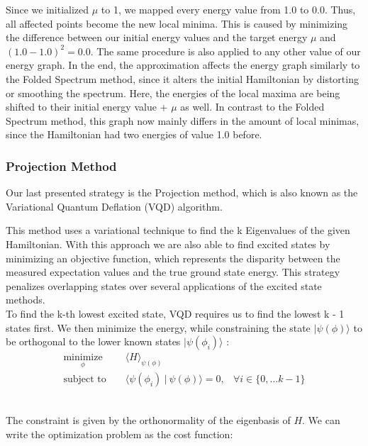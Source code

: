\documentclass[
  letterpaper,
  DIV=11,
  numbers=noendperiod]{scrartcl}
\begin{document}
Since we initialized \(\mu\) to 1, we mapped every energy value from 1.0
to 0.0. Thus, all affected points become the new local minima. This is
caused by minimizing the difference between our initial energy values
and the target energy \(\mu\) and \((1.0 - 1.0)^2 = 0.0\). The same
procedure is also applied to any other value of our energy graph. In the
end, the approximation affects the energy graph similarly to the Folded
Spectrum method, since it alters the initial Hamiltonian by distorting
or smoothing the spectrum. Here, the energies of the local maxima are
being shifted to their initial energy value + \(\mu\) as well. In
contrast to the Folded Spectrum method, this graph now mainly differs in
the amount of local minimas, since the Hamiltonian had two energies of
value 1.0 before.

\subsubsection{Projection Method}\label{projection-method}

Our last presented strategy is the Projection method, which is also
known as the Variational Quantum Deflation (VQD) algorithm.

This method uses a variational technique to find the k Eigenvalues of
the given Hamiltonian. With this approach we are also able to find
excited states by minimizing an objective function, which represents the
disparity between the measured expectation values and the true ground
state energy. This strategy penalizes overlapping states over several
applications of the excited state methods.\\

To find the k-th lowest excited state, VQD requires us to find the
lowest k - 1 states first. We then minimize the energy, while
constraining the state \(|\psi(\phi)\rangle\) to be orthogonal to the
lower known states \(|\psi(\phi_{i})\rangle\) :\\
\begin{align}
\underset{\phi}{\text{minimize}} & & \langle H\rangle_{\psi(\phi)} & \\
\text{subject to } & & \langle\psi(\phi_{i})~|~\psi(\phi)\rangle = 0, & \forall i \in \{ 0,\ldots k - 1\}
\end{align}\\

\strut

The constraint is given by the orthonormality of the eigenbasis of
\(H\). We can write the optimization problem as the cost function:\\
\end{document}
